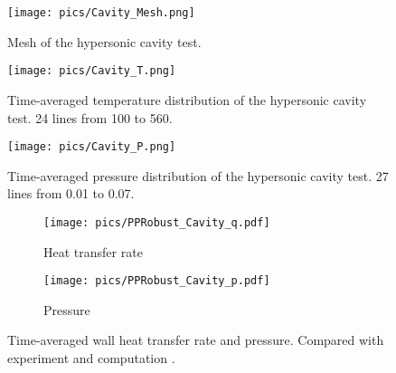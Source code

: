 \begin{figure}[htbp]
    \centering
    \texttt{[image: pics/Cavity\_Mesh.png]}
    \caption{Mesh of the hypersonic cavity test.}
    \label{fig:Cavity_mesh}
\end{figure}


\begin{figure}[htbp]
    \centering
    \texttt{[image: pics/Cavity\_T.png]}
    \caption{Time-averaged temperature distribution of the hypersonic cavity test. 24 lines from 100 to 560.}
    \label{fig:Cavity_T}
\end{figure}

\begin{figure}[htbp]
    \centering
    \texttt{[image: pics/Cavity\_P.png]}
    \caption{Time-averaged pressure distribution of the hypersonic cavity test. 27 lines from 0.01 to 0.07.}
    \label{fig:Cavity_P}
\end{figure}

\begin{figure}[htbp!]
    \centering
    \begin{subfigure}{0.5\textwidth}
        \texttt{[image: pics/PPRobust\_Cavity\_q.pdf]}
        \caption[]{Heat transfer rate}
        \label{sfig:Cavity1_q}
    \end{subfigure}\hfill
    \begin{subfigure}{0.5\textwidth}
        \texttt{[image: pics/PPRobust\_Cavity\_p.pdf]}
        \caption[]{Pressure}
        \label{sfig:Cavity1_p}
    \end{subfigure}
    \caption{Time-averaged wall heat transfer rate and pressure. 
    Compared with experiment \cite{hahn1969experimental} and computation \cite{morgenstern1994hypersonic}.}
    \label{fig:Cavity1}
\end{figure}


